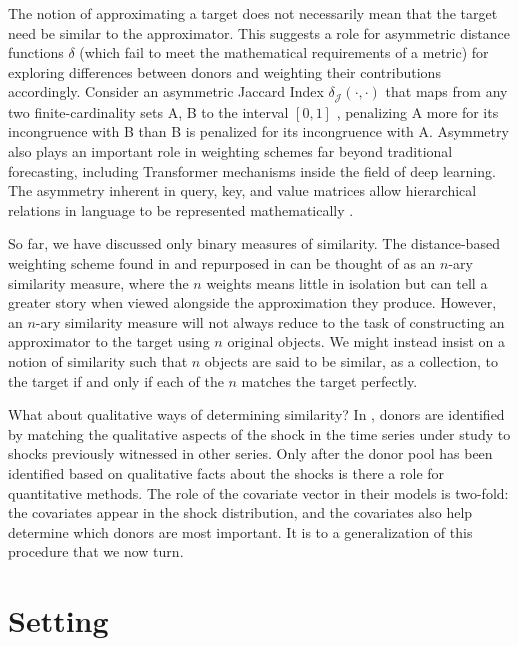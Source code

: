 \documentclass{uiucthesis2021}
\theoremstyle{definition}
\begin{document}
  The notion of approximating a target does not necessarily mean that the target need be similar to the approximator.  This suggests a role for asymmetric distance functions $\delta$ (which fail to meet the mathematical requirements of a metric) for exploring differences between donors and weighting their contributions accordingly.  Consider an asymmetric Jaccard Index $\delta_{\mathcal{J}}(\cdot,\cdot)$ that maps from any two finite-cardinality sets A, B to the interval $[0,1]$ \parencite[][]{garg2015asymmetric}, penalizing A more for its incongruence with B than B is penalized for its incongruence with A.  Asymmetry also plays an important role in weighting schemes far beyond traditional forecasting, including Transformer mechanisms inside the field of deep learning.  The asymmetry inherent in query, key, and value matrices allow hierarchical relations in language to be represented mathematically \parencite[][p. 364]{bishop2023deep}.  
  
  So far, we have discussed only binary measures of similarity.  The distance-based weighting scheme found in \cite[][]{lin2021minimizing} and repurposed in \cite[][]{lundquist2024volatility} can be thought of as an $n$-ary similarity measure, where the $n$ weights means little in isolation but can tell a greater story when viewed alongside the approximation they produce.  However, an $n$-ary similarity measure will not always reduce to the task of constructing an approximator to the target using $n$ original objects.  We might instead insist on a notion of similarity such that $n$ objects are said to be similar, as a collection, to the target if and only if each of the $n$ matches the target perfectly.
  
  What about qualitative ways of determining similarity?  In \cite[][]{lin2021minimizing}\cite[][]{lundquist2024volatility}, donors are identified by matching the qualitative aspects of the shock in the time series under study to shocks previously witnessed in other series.  Only after the donor pool has been identified based on qualitative facts about the shocks is there a role for quantitative methods.  The role of the covariate vector in their models is two-fold: the covariates appear in the shock distribution, and the covariates also help determine which donors are most important.  It is to a generalization of this procedure that we now turn.
  
  \section{Setting}\label{Setting}
  
\end{document}
